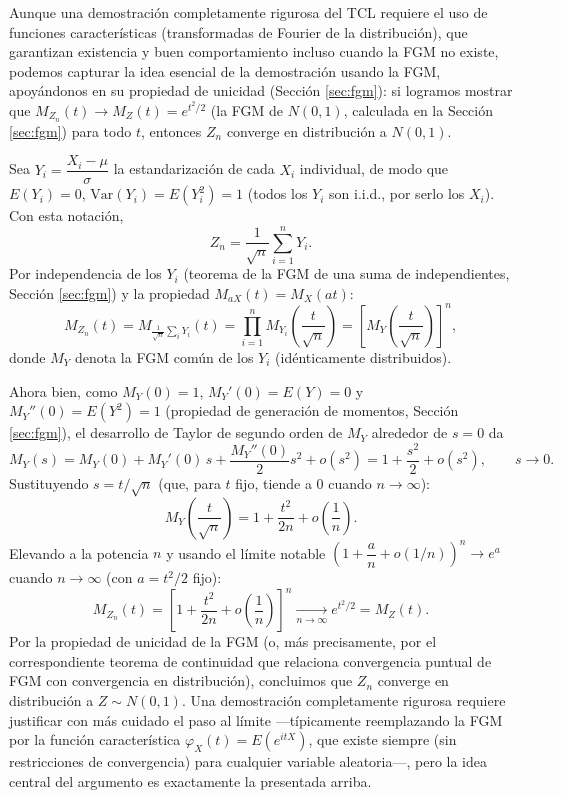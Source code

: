 \documentclass[11pt,a4paper]{article}
\theoremstyle{plain}
\theoremstyle{definition}
\theoremstyle{remark}
\begin{document}
Aunque una demostración completamente rigurosa del TCL requiere el uso de funciones características (transformadas de Fourier de la distribución), que garantizan existencia y buen comportamiento incluso cuando la FGM no existe, podemos capturar la idea esencial de la demostración usando la FGM, apoyándonos en su propiedad de unicidad (Sección \ref{sec:fgm}): si logramos mostrar que $M_{Z_n}(t)\to M_Z(t)=e^{t^2/2}$ (la FGM de $N(0,1)$, calculada en la Sección \ref{sec:fgm}) para todo $t$, entonces $Z_n$ converge en distribución a $N(0,1)$.

Sea $Y_i=\dfrac{X_i-\mu}{\sigma}$ la estandarización de cada $X_i$ individual, de modo que $E(Y_i)=0$, $\text{Var}(Y_i)=E(Y_i^2)=1$ (todos los $Y_i$ son i.i.d., por serlo los $X_i$). Con esta notación,
\[
Z_n = \frac{1}{\sqrt n}\sum_{i=1}^n Y_i.
\]
Por independencia de los $Y_i$ (teorema de la FGM de una suma de independientes, Sección \ref{sec:fgm}) y la propiedad $M_{aX}(t)=M_X(at)$:
\[
M_{Z_n}(t) = M_{\frac{1}{\sqrt n}\sum_i Y_i}(t) = \prod_{i=1}^n M_{Y_i}\!\left(\frac{t}{\sqrt n}\right) = \left[M_Y\!\left(\frac{t}{\sqrt n}\right)\right]^n,
\]
donde $M_Y$ denota la FGM común de los $Y_i$ (idénticamente distribuidos).

Ahora bien, como $M_Y(0)=1$, $M_Y'(0)=E(Y)=0$ y $M_Y''(0)=E(Y^2)=1$ (propiedad de generación de momentos, Sección \ref{sec:fgm}), el desarrollo de Taylor de segundo orden de $M_Y$ alrededor de $s=0$ da
\[
M_Y(s) = M_Y(0) + M_Y'(0)\,s + \frac{M_Y''(0)}{2}s^2 + o(s^2) = 1 + \frac{s^2}{2} + o(s^2), \qquad s\to0.
\]
Sustituyendo $s=t/\sqrt n$ (que, para $t$ fijo, tiende a $0$ cuando $n\to\infty$):
\[
M_Y\!\left(\frac{t}{\sqrt n}\right) = 1 + \frac{t^2}{2n} + o\!\left(\frac1n\right).
\]
Elevando a la potencia $n$ y usando el límite notable $\left(1+\dfrac{a}{n}+o(1/n)\right)^n \to e^a$ cuando $n\to\infty$ (con $a=t^2/2$ fijo):
\[
M_{Z_n}(t) = \left[1+\frac{t^2}{2n}+o\!\left(\frac1n\right)\right]^n \xrightarrow[n\to\infty]{} e^{t^2/2} = M_Z(t).
\]
Por la propiedad de unicidad de la FGM (o, más precisamente, por el correspondiente teorema de continuidad que relaciona convergencia puntual de FGM con convergencia en distribución), concluimos que $Z_n$ converge en distribución a $Z\sim N(0,1)$. Una demostración completamente rigurosa requiere justificar con más cuidado el paso al límite —típicamente reemplazando la FGM por la función característica $\varphi_X(t)=E(e^{itX})$, que existe siempre (sin restricciones de convergencia) para cualquier variable aleatoria—, pero la idea central del argumento es exactamente la presentada arriba.
\end{document}
